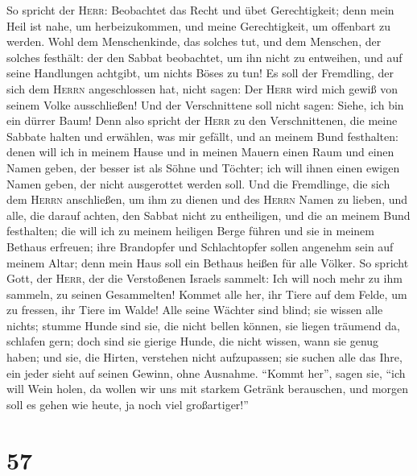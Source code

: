  So spricht der \textsc{Herr}: Beobachtet das Recht und
übet Gerechtigkeit; denn mein Heil ist nahe, um herbeizukommen, und
meine Gerechtigkeit, um offenbart zu werden.  Wohl dem
Menschenkinde, das solches tut, und dem Menschen, der solches festhält:
der den Sabbat beobachtet, um ihn nicht zu entweihen, und auf seine
Handlungen achtgibt, um nichts Böses zu tun!  Es soll der
Fremdling, der sich dem \textsc{Herrn} angeschlossen hat, nicht sagen:
Der \textsc{Herr} wird mich gewiß von seinem Volke ausschließen! Und der
Verschnittene soll nicht sagen: Siehe, ich bin ein dürrer Baum!
 Denn also spricht der \textsc{Herr} zu den
Verschnittenen, die meine Sabbate halten und erwählen, was mir gefällt,
und an meinem Bund festhalten:  denen will ich in meinem
Hause und in meinen Mauern einen Raum und einen Namen geben, der besser
ist als Söhne und Töchter; ich will ihnen einen ewigen Namen geben, der
nicht ausgerottet werden soll.  Und die Fremdlinge, die
sich dem \textsc{Herrn} anschließen, um ihm zu dienen und des
\textsc{Herrn} Namen zu lieben, und alle, die darauf achten, den Sabbat
nicht zu entheiligen, und die an meinem Bund festhalten; 
die will ich zu meinem heiligen Berge führen und sie in meinem Bethaus
erfreuen; ihre Brandopfer und Schlachtopfer sollen angenehm sein auf
meinem Altar; denn mein Haus soll ein Bethaus heißen für alle Völker.
 So spricht Gott, der \textsc{Herr}, der die Verstoßenen
Israels sammelt: Ich will noch mehr zu ihm sammeln, zu seinen
Gesammelten!  Kommet alle her, ihr Tiere auf dem Felde, um
zu fressen, ihr Tiere im Walde!  Alle seine Wächter sind
blind; sie wissen alle nichts; stumme Hunde sind sie, die nicht bellen
können, sie liegen träumend da, schlafen gern;  doch sind
sie gierige Hunde, die nicht wissen, wann sie genug haben; und sie, die
Hirten, verstehen nicht aufzupassen; sie suchen alle das Ihre, ein jeder
sieht auf seinen Gewinn, ohne Ausnahme.  ``Kommt her'',
sagen sie, ``ich will Wein holen, da wollen wir uns mit starkem Getränk
berauschen, und morgen soll es gehen wie heute, ja noch viel
großartiger!''

\hypertarget{section-56}{%
\section{57}\label{section-56}}

